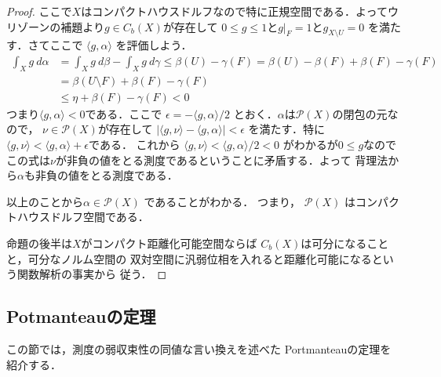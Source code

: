 \documentclass[leqno, a4paper, 12pt]{jsarticle}
\begin{document}
\begin{proof}
ここで$X$はコンパクトハウスドルフなので特に正規空間である．よってウリゾーンの補題より$g\in C_{b}(X)$が存在して
$0\le g\le 1$と$g|_{F}=1$と$g_{X\setminus U}=0$
を満たす．さてここで
$\langle g, \alpha \rangle $
を評価しよう．
\begin{align*}
\int_{X}g \ d\alpha
&=\int_{X}g\ d\beta -\int_{X} g \ d\gamma
\le \beta(U)-\gamma(F)
=\beta(U)-\beta(F)+\beta(F)-\gamma(F)\\
&=
\beta(U\setminus F)+\beta(F)-\gamma(F)\\
&\le \eta+\beta(F)-\gamma(F)<0
\end{align*}
つまり$\langle g, \alpha\rangle<0$である．ここで
$\epsilon=-\langle g, \alpha\rangle/2 $
とおく．$\alpha$は$\mathcal{P}(X)$の閉包の元なので，
$\nu\in \mathcal{P}(X)$が存在して
$|\langle g, \nu\rangle -\langle g, \alpha\rangle|<\epsilon$
を満たす．特に
$\langle g, \nu\rangle <\langle g, \alpha \rangle +\epsilon$である．
これから
$\langle g, \nu\rangle <\langle g, \alpha \rangle/2<0$
がわかるが$0 \le g$なのでこの式は$\nu$が非負の値をとる測度であるということに矛盾する．よって
背理法から$\alpha$も非負の値をとる測度である．

以上のことから$\alpha\in \mathcal{P}(X)$
であることがわかる．
つまり，
$\mathcal{P}(X)$
はコンパクトハウスドルフ空間である．

命題の後半は$X$がコンパクト距離化可能空間ならば
$C_{b}(X)$は可分になることと，可分なノルム空間の
双対空間に汎弱位相を入れると距離化可能になるという関数解析の事実から
従う．
\end{proof}



\subsection{Potmanteauの定理}
この節では，測度の弱収束性の同値な言い換えを述べた
Portmanteauの定理を紹介する．
\end{document}
